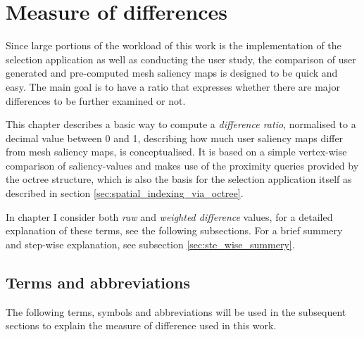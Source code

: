 	\section {Measure of differences}
	\label{sec:measure_of_difference}
Since large portions of the workload of this work is the implementation of the selection application as well as conducting the user study, the comparison of user generated and pre-computed mesh saliency maps is designed to be quick and easy. The main goal is to have a ratio that expresses whether there are major differences to be further examined or not.

This chapter describes a basic way to compute a \textit{difference ratio}, normalised to a decimal value between 0 and 1, describing how much user saliency maps differ from mesh saliency maps, is conceptualised. It is based on a simple vertex-wise comparison of saliency-values and makes use of the proximity queries provided by the octree structure, which is also the basis for the selection application itself as described in section \ref{sec:spatial_indexing_via_octree}.

In chapter %
I consider both \textit{raw} and \textit{weighted difference} values, for a detailed explanation of these terms, see the following subsections. For a brief summery and step-wise explanation, see subsection \ref{sec:ste_wise_summery}.

		\subsection{Terms and abbreviations}
		\label{sec:concept_terms_and_abbreviations}
The following terms, symbols and abbreviations will be used in the subsequent sections to explain the measure of difference used in this work.

